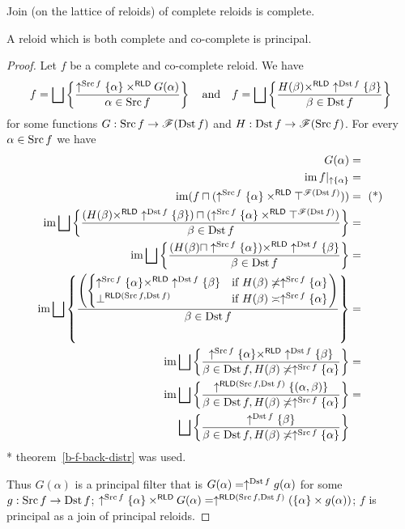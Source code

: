 \begin{obvious}
Join (on the lattice of reloids) of complete reloids is complete.\end{obvious}
\begin{thm}
A reloid which is both complete and co-complete is principal.\end{thm}
\begin{proof}
Let $f$ be a complete and co-complete reloid. We have
\[
f=\bigsqcup\setcond{\uparrow^{\Src f}\{\alpha\}\times^{\mathsf{RLD}}G(\alpha)}{\alpha\in\Src f}\quad\text{and}\quad f=\bigsqcup\setcond{H(\beta)\times^{\mathsf{RLD}}\uparrow^{\Dst f}\{\beta\}}{\beta\in\Dst f}
\]
for some functions $G:\operatorname{Src} f\rightarrow\mathscr{F}(\operatorname{Dst} f)$ and $H:\operatorname{Dst} f\rightarrow\mathscr{F}(\operatorname{Src} f)$.
For every $\alpha\in\operatorname{Src} f$ we have
\begin{align*}
G(\alpha) & =\\
\im f|_{\uparrow \{\alpha\}} & =\\
\im(f\sqcap(\uparrow^{\Src f}\{\alpha\}\times^{\mathsf{RLD}}\top^{\mathscr{F}(\Dst f)})) & =\text{ (*)}\\
\im\bigsqcup\setcond{(H(\beta)\times^{\mathsf{RLD}}\uparrow^{\Dst f}\{\beta\})\sqcap(\uparrow^{\Src f}\{\alpha\}\times^{\mathsf{RLD}}\top^{\mathscr{F}(\Dst f)})}{\beta\in\Dst f} & =\\
\im\bigsqcup\setcond{(H(\beta)\sqcap\uparrow^{\Src f}\{\alpha\})\times^{\mathsf{RLD}}\uparrow^{\Dst f}\{\beta\}}{\beta\in\Dst f} & =\\
\im\bigsqcup\setcond{\left(\begin{cases}
\uparrow^{\Src f}\{\alpha\}\times^{\mathsf{RLD}}\uparrow^{\Dst f}\{\beta\} & \text{if }\ensuremath{H(\beta)\nasymp\uparrow^{\Src f}\{\alpha\}}\\
\bot^{\mathsf{RLD}(\Src f,\Dst f)} & \text{if }\ensuremath{H(\beta)\asymp\uparrow^{\Src f}\{\alpha\}}
\end{cases}\right)}{\beta\in\Dst f} & =\\
\im\bigsqcup\setcond{\uparrow^{\Src f}\{\alpha\}\times^{\mathsf{RLD}}\uparrow^{\Dst f}\{\beta\}}{\beta\in\Dst f,H(\beta)\nasymp\uparrow^{\Src f}\{\alpha\}} & =\\
\im\bigsqcup\setcond{\uparrow^{\mathsf{RLD}(\Src f,\Dst f)}\{(\alpha,\beta)\}}{\beta\in\Dst f,H(\beta)\nasymp\uparrow^{\Src f}\{\alpha\}} & =\\
\bigsqcup\setcond{\uparrow^{\Dst f}\{\beta\}}{\beta\in\Dst f,H(\beta)\nasymp\uparrow^{\Src f}\{\alpha\}}
\end{align*}
{*} theorem~\ref{b-f-back-distr} was used.

Thus $G(\alpha)$ is a principal filter that is $G(\alpha)=\uparrow^{\operatorname{Dst} f}g(\alpha)$
for some $g:\operatorname{Src} f\rightarrow\operatorname{Dst} f$; $\uparrow^{\operatorname{Src} f}\{\alpha\}\times^{\mathsf{RLD}}G(\alpha)=\uparrow^{\mathsf{RLD}(\operatorname{Src} f,\operatorname{Dst} f)}(\{\alpha\}\times g(\alpha))$;
$f$ is principal as a join of principal reloids.\end{proof}
